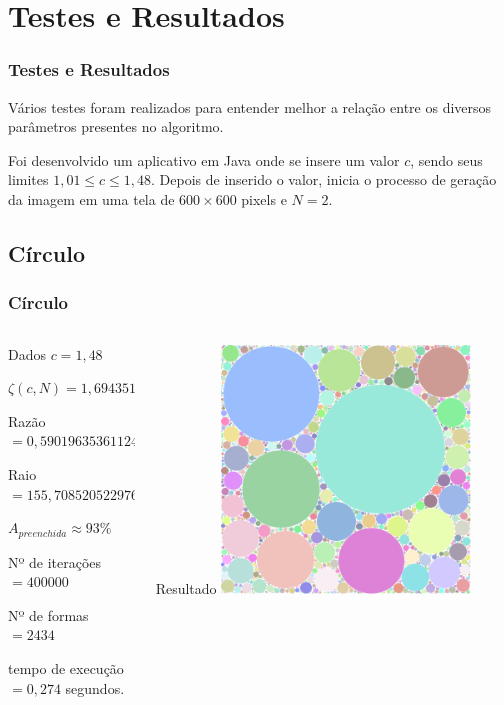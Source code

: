 \documentclass[aspectratio=169]{beamer}
\begin{document}
\section{Testes e Resultados}
\begin{frame}
\frametitle{Testes e Resultados}
Vários testes foram realizados para entender melhor a relação entre os diversos parâmetros presentes no algoritmo.
\medskip

Foi desenvolvido um aplicativo em Java onde se insere um valor $c$, sendo seus limites $1,01 \leqslant c \leqslant 1,48$. Depois de inserido o valor, inicia o processo de geração da imagem em uma tela de $600 \times 600$ pixels e $N=2$.

\end{frame}

\subsection{Círculo}

\begin{frame}
\frametitle{Círculo}
\begin{columns}[T]
\begin{column}{.5\textwidth}
\begin{block}{\centering Dados}
$c=1,48$
\smallskip

$\zeta(c,N)=1,694351369474375$
\smallskip

Razão $=0,5901963536112477$
\smallskip

Raio $=155,70852052297627$
\smallskip

$A_{preenchida} \approx 93\%$
\smallskip

Nº de iterações $=400000$
\smallskip

Nº de formas $=2434$
\smallskip

tempo de execução $= 0,274$ segundos.
\smallskip
\end{block}
\end{column}

\begin{column}{.5\textwidth}
\begin{block}{\centering Resultado}
\centering
\includegraphics[width=0.7\textwidth]{exemplo2}
\end{block}
\end{column}
\end{columns}
\end{frame}
\end{document}
